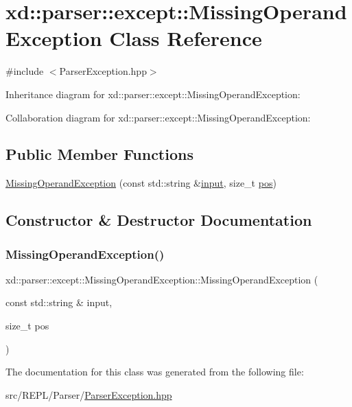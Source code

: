 \hypertarget{classxd_1_1parser_1_1except_1_1_missing_operand_exception}{}\section{xd\+:\+:parser\+:\+:except\+:\+:Missing\+Operand\+Exception Class Reference}
\label{classxd_1_1parser_1_1except_1_1_missing_operand_exception}


{\ttfamily \#include $<$Parser\+Exception.\+hpp$>$}



Inheritance diagram for xd\+:\+:parser\+:\+:except\+:\+:Missing\+Operand\+Exception\+:


Collaboration diagram for xd\+:\+:parser\+:\+:except\+:\+:Missing\+Operand\+Exception\+:
\subsection*{Public Member Functions}
\begin{DoxyCompactItemize}
\item 
\mbox{\hyperlink{classxd_1_1parser_1_1except_1_1_missing_operand_exception_a68a9e2418f4681e64e4edac8ddd933a5}{Missing\+Operand\+Exception}} (const std\+::string \&\mbox{\hyperlink{classxd_1_1parser_1_1except_1_1_parser_exception_a6fde0ecef06df6bc2bcaef504269acea}{input}}, size\+\_\+t \mbox{\hyperlink{classxd_1_1parser_1_1except_1_1_parser_exception_ab58b07ce51aef576df0cfe45f0c7e222}{pos}})
\end{DoxyCompactItemize}


\subsection{Constructor \& Destructor Documentation}
\mbox{\label{classxd_1_1parser_1_1except_1_1_missing_operand_exception_a68a9e2418f4681e64e4edac8ddd933a5}} 
\subsubsection{\texorpdfstring{Missing\+Operand\+Exception()}{MissingOperandException()}}
{\footnotesize\ttfamily xd\+::parser\+::except\+::\+Missing\+Operand\+Exception\+::\+Missing\+Operand\+Exception (\begin{DoxyParamCaption}\item[{const std\+::string \&}]{input,  }\item[{size\+\_\+t}]{pos }\end{DoxyParamCaption})\hspace{0.3cm}{\ttfamily [inline]}}



The documentation for this class was generated from the following file\+:\begin{DoxyCompactItemize}
\item 
src/\+R\+E\+P\+L/\+Parser/\mbox{\hyperlink{_parser_exception_8hpp}{Parser\+Exception.\+hpp}}\end{DoxyCompactItemize}
